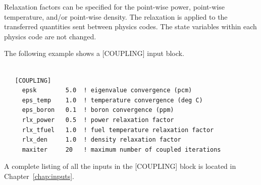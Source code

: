 Relaxation factors can be specified for the point-wise power, point-wise temperature, and/or point-wise density.
The relaxation is applied to the transferred quantities sent between physics codes. The state variables
within each physics code are not changed.

The following example shows a [COUPLING] input block.

\begin{Verbatim}[fontsize=\small]

   [COUPLING]
     epsk        5.0  ! eigenvalue convergence (pcm)
     eps_temp    1.0  ! temperature convergence (deg C)
     eps_boron   0.1  ! boron convergence (ppm)
     rlx_power   0.5  ! power relaxation factor
     rlx_tfuel   1.0  ! fuel temperature relaxation factor
     rlx_den     1.0  ! density relaxation factor
     maxiter     20   ! maximum number of coupled iterations

\end{Verbatim}

A complete listing of all the inputs in the [COUPLING] block is located in Chapter~\ref{chap:inputs}.
